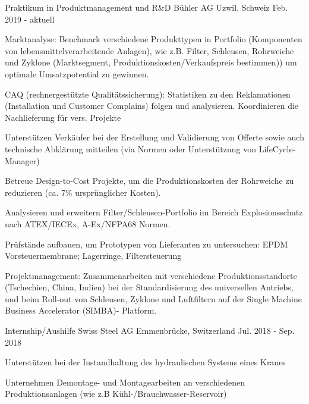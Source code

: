 

\begin{cventries}

\cventry
	{Praktikum in Produktmanagement und R\&D} %
	{Bühler AG} %
	{Uzwil, Schweiz} %
	{Feb. 2019 - aktuell} %
	{
		\begin{cvitems} %
			\item {Marktanalyse: Benchmark verschiedene Produkttypen in Portfolio (Komponenten von lebensmittelverarbeitende Anlagen), wie z.B. Filter, Schleusen, Rohrweiche und Zyklone (Marktsegment, Produktionskosten/Verkaufspreis bestimmen)) um optimale Umsatzpotential zu gewinnen.}
			\item {CAQ (rechnergestützte Qualitätssicherung): Statistiken zu den Reklamationen (Installation und Customer Complains) folgen und analysieren. Koordinieren die Nachlieferung für vers. Projekte}
			\item {Unterstützen Verkäufer bei der Erstellung und Validierung von Offerte sowie auch technische Abklärung mitteilen (via Normen oder Unterstützung von LifeCycle-Manager) }
			\item {Betreue Design-to-Cost Projekte, um die Produktionskosten der Rohrweiche zu reduzieren (ca. 7\% ursprünglicher Kosten).}
			\item {Analysieren und erweitern Filter/Schleusen-Portfolio im Bereich Explosionsschutz nach ATEX/IECEx, A-Ex/NFPA68 Normen.}
			\item {Prüfstände aufbauen, um Prototypen von Lieferanten zu untersuchen: EPDM Vorsteuermembrane; Lagerringe, Filtersteuerung}
			\item {Projektmanagement: Zusammenarbeiten mit verschiedene Produktionsstandorte (Tschechien, China, Indien) bei der Standardisierung des universellen Antriebs, und beim Roll-out von Schleusen, Zyklone und Luftfiltern auf der Single Machine Business Accelerator (SIMBA)- Platform.}
		\end{cvitems}
}	


\cventry
	{Internship/Aushilfe} %
	{Swiss Steel AG} %
	{Emmenbrücke, Switzerland} %
	{Jul. 2018 - Sep. 2018} %
	{
		\begin{cvitems} %
			\item {Unterstützen bei der Instandhaltung des hydraulischen Systems eines Kranes}
			\item {Unternehmen Demontage- und Montagearbeiten an verschiedenen Produktionsanlagen (wie z.B Kühl-/Brauchwasser-Reservoir)}
		\end{cvitems}
}	


\end{cventries}
